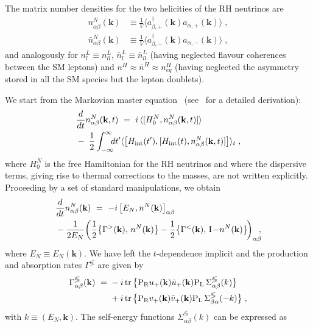 \documentclass[prd,twocolumn,superscriptaddress,preprintnumbers,nofootinbib,
noshowpacs,groupedaddress]{revtex4-1} %
\DeclareMathOperator{\tr}{tr}
\newcommand{\ve}[1]{\mathbf{#1}}
\begin{document}
The matrix number densities for the two helicities of the RH neutrinos are
\begin{align}
n^N_{\alpha \beta}(\ve k) &\equiv \frac{1}{V} \langle a^\dag_{\beta,+}(\ve k) a_{\alpha,+}(\ve k)\rangle\;, \\
\bar n^N_{\alpha \beta}(\ve k) &\equiv \frac{1}{V} \langle a^\dag_{\beta,-}(\ve k) a_{\alpha,-}(\ve k)\rangle \;, 
\end{align}
and analogously for $n^L_{l} \equiv n^L_{ll}$, $\bar n^L_{l} \equiv \bar n^L_{ll}$ (having neglected flavour coherences between the SM leptons) and $n^H \approx \bar n^{H} \approx n^H_{eq }$ (having neglected the asymmetry stored in all the SM species but the lepton doublets).

We start from the Markovian master equation~\cite{Sigl:1992fn} (see~\cite{Dev:2014laa} for a detailed derivation):
\begin{align} 
& \frac{d}{d t} n^N_{\alpha \beta}(\ve k, t) \ = \ i \,\langle [H_0^N, n^N_{\alpha \beta}(\ve k, t)]\rangle \; \notag\\ &- \; \frac{1}{2} \int_{- \infty}^{\infty}\!\!\! dt' \langle \big[ H_{\rm int}(t'), [H_{\rm int}(t), n^N_{\alpha \beta}(\ve k, t)] \big]\rangle_t   \;,
\end{align}
where $H_0^N$ is the free Hamiltonian for the RH neutrinos and where the dispersive terms, giving rise to thermal corrections to the masses, are not written explicitly.
Proceeding by a set of standard manipulations, we obtain 
\begin{align}\label{eq:transport_eq}
& \frac{d}{d t} n^N_{\alpha \beta}(\ve k) \ = \ - i \, \big[E_N, n^N(\ve k)\big]_{\alpha \beta} \notag\\
& - \frac{1}{2 E_N} \! \left( \frac{1}{2} \big\{ \Gamma^{>}(\ve k), \, n^N(\ve k)\big\} -  \frac{1}{2}\big\{ \Gamma^{<}(\ve k), \, \mathrm{I} \!-\! n^N(\ve k)\big\} \!\right)_{\alpha \beta} \!\!\!,
\end{align}
where $E_N \equiv E_N(\ve k)$. We have left the $t$-dependence implicit and the production and absorption rates $\Gamma^{\lessgtr}$ are given by 
\begin{align}\label{eq:gammas}
\Gamma_{\alpha \beta}^\lessgtr(\ve k) \ = \ &- i \tr \big\{\mathrm{P_R} u_+(\ve k) \bar u_+(\ve k) \mathrm{P_L}  \, \Sigma_{\alpha \beta}^{\lessgtr}(k) \big\} \notag \\ 
&+ i \tr \big\{\mathrm{P_R} v_+(\ve k) \bar v_+(\ve k) \mathrm{P_L}  \, \Sigma_{\beta \alpha}^{\lessgtr}(-k) \big\} \;,
\end{align}
with $k \equiv (E_N, \ve k)$. The self-energy functions $\Sigma_{\alpha \beta}^{\lessgtr}(k)$ can be expressed as
\end{document}
